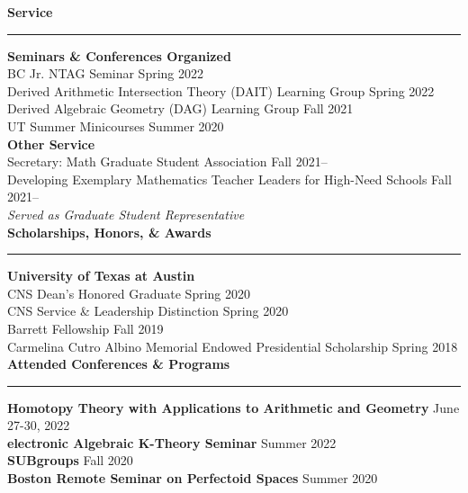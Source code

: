 \documentclass[11pt]{article}
\newenvironment{mysection}{
\color{mygreen}\bfseries\large
}
{
\\ \rule{\textwidth}{1pt}\hspace{-.25em}
} %
\begin{document}
\begin{mysection}Service \end{mysection}
\textbf{Seminars \& Conferences Organized} \\
BC Jr. NTAG Seminar \hfill Spring 2022 \\
Derived Arithmetic Intersection Theory (DAIT) Learning Group \hfill Spring 2022 \\
Derived Algebraic Geometry (DAG) Learning Group \hfill Fall 2021 \\
UT Summer Minicourses \hfill Summer 2020 \\

\textbf{Other Service} \\
Secretary: Math Graduate Student Association \hfill Fall 2021-- \\
Developing Exemplary Mathematics Teacher Leaders for High-Need Schools \hfill Fall 2021--\\
\textit{Served as Graduate Student Representative} \\

\begin{mysection}Scholarships, Honors, \& Awards\end{mysection}
\textbf{University of Texas at Austin} \\
CNS Dean's Honored Graduate \hfill Spring 2020 \\
CNS Service \& Leadership Distinction \hfill Spring 2020 \\
Barrett Fellowship \hfill Fall 2019 \\
Carmelina Cutro Albino Memorial Endowed Presidential Scholarship \hfill Spring 2018 \\

\begin{mysection}Attended Conferences \& Programs\end{mysection}
\textbf{Homotopy Theory with Applications to Arithmetic and Geometry} \hfill June 27-30, 2022 \\
\textbf{electronic Algebraic K-Theory Seminar} \hfill Summer 2022 \\
\textbf{SUBgroups} \hfill Fall 2020 \\
\textbf{Boston Remote Seminar on Perfectoid Spaces} \hfill Summer 2020 \\
\end{document}
